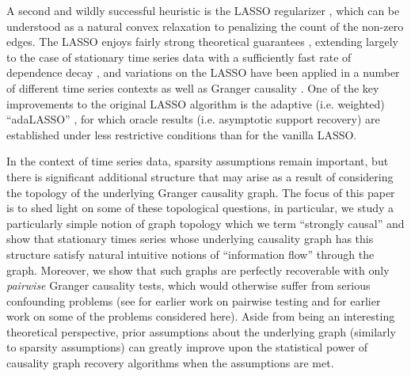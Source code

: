 \documentclass[12pt]{article}
\begin{document}
A second and wildly successful heuristic is the LASSO regularizer
\cite{tibshirani1996regression}, which can be understood as a natural
convex relaxation to penalizing the count of the non-zero edges.  The
LASSO enjoys fairly strong theoretical guarantees
\cite{wainwright2009sharp}, extending largely to the case of
stationary time series data with a sufficiently fast rate of
dependence decay \cite{basu2015} \cite{wong2016lasso}
\cite{autoregressive_process_modelling_via_the_lasso_procedure}, and
variations on the LASSO have been applied in a number of different
time series contexts as well as Granger causality
\cite{DBLP:journals/corr/HallacPBL17} \cite{haufe2008sparse}
\cite{bolstad2011causal} \cite{he2013stationary}
\cite{grouped_graphical_granger_modelling_for_gene_expression_regulatory_networks_discovery}.
One of the key improvements to the original LASSO algorithm is the
adaptive (i.e. weighted) ``adaLASSO'' \cite{adaptive_lasso_zou2006},
for which oracle results (i.e. asymptotic support recovery) are
established under less restrictive conditions than for the vanilla
LASSO.


In the context of time series data, sparsity assumptions remain
important, but there is significant additional structure that may
arise as a result of considering the topology of the underlying
Granger causality graph.  The focus of this paper is to shed light on
some of these topological questions, in particular, we study a
particularly simple notion of graph topology which we term ``strongly
causal'' and show that stationary times series whose underlying
causality graph has this structure satisfy natural intuitive notions
of ``information flow'' through the graph.  Moreover, we show that
such graphs are perfectly recoverable with only \textit{pairwise}
Granger causality tests, which would otherwise suffer from serious
confounding problems (see \cite{tam2013gene_pwgc} for earlier work on
pairwise testing and \cite{datta2014mmse} for earlier work on some of
the problems considered here).  Aside from being an interesting
theoretical perspective, prior assumptions about the underlying graph
(similarly to sparsity assumptions) can greatly improve upon the
statistical power of causality graph recovery algorithms when the
assumptions are met.
\end{document}
